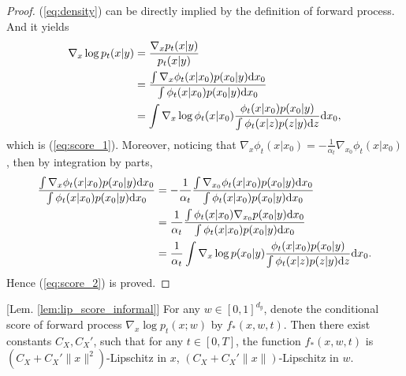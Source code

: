 \documentclass[11pt]{article}
\numberwithin{equation}{section}
\renewcommand{\eqref}[1]{(\ref{#1})}
\begin{document}
\begin{proof}
    \eqref{eq:density} can be directly implied by the definition of forward process.
    And it yields
    \begin{equation}
        \begin{aligned}
            \nabla_x\log p_t(x|y)
            &=\frac{\nabla_x p_t(x|y)}{p_t(x|y)} \\
            &=\frac{\int \nabla_x\phi_t(x|x_0)p(x_0|y)\mathrm{d} x_0}{\int \phi_t(x|x_0)p(x_0|y)\mathrm{d} x_0} \\
            &=\int \nabla_x\log\phi_t(x|x_0)\frac{\phi_t(x|x_0)p(x_0|y)}{\int \phi_t(x|z)p(z|y)\mathrm{d} z}\mathrm{d} x_0,
        \end{aligned}
    \end{equation}
    which is \eqref{eq:score_1}. 
    Moreover, noticing that $\nabla_x\phi_t(x|x_0)=-\frac{1}{\alpha_t}\nabla_{x_0}\phi_t(x|x_0)$, then by integration by parts,
    \begin{equation}
        \begin{aligned}
            \frac{\int \nabla_x\phi_t(x|x_0)p(x_0|y)\mathrm{d} x_0}{\int \phi_t(x|x_0)p(x_0|y)\mathrm{d} x_0}
            &= -\frac{1}{\alpha_t}\frac{\int \nabla_{x_0}\phi_t(x|x_0)p(x_0|y)\mathrm{d} x_0}{\int \phi_t(x|x_0)p(x_0|y)\mathrm{d} x_0} \\
            &= \frac{1}{\alpha_t}\frac{\int \phi_t(x|x_0)\nabla_{x_0}p(x_0|y)\mathrm{d} x_0}{\int \phi_t(x|x_0)p(x_0|y)\mathrm{d} x_0} \\
            &=\frac{1}{\alpha_t}\int \nabla_x\log p(x_0|y)\frac{\phi_t(x|x_0)p(x_0|y)}{\int \phi_t(x|z)p(z|y)\mathrm{d} z}\mathrm{d} x_0.
        \end{aligned}
    \end{equation}
    Hence \eqref{eq:score_2} is proved.
\end{proof}

\begin{lemma}\label{lem:lip_score}[Lem. \ref{lem:lip_score_informal}]
    For any $w\in[0,1]^{d_y}$, denote the conditional score of forward process $\nabla_x\log p_t(x;w)$ by $f_*(x,w,t)$. Then there exist constants $C_X,C_X'$, such that for any $t\in[0,T]$, the function $f_*(x,w,t)$ is $(C_X+C_X'\|x\|^2)$-Lipschitz in $x$, $(C_X+C_X'\|x\|)$-Lipschitz in $w$.
\end{lemma}
\end{document}
